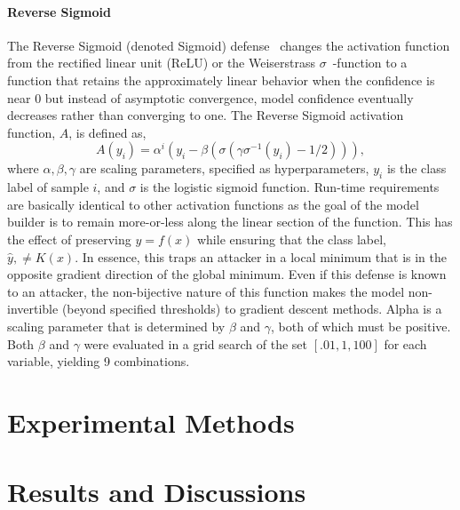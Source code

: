 \documentclass[lettersize,journal]{IEEEtran}
\newcommand{\erik}[1]{\textit{[{\color{brown}Erik: #1}]}}
\begin{document}
\paragraph{Reverse Sigmoid}
The Reverse Sigmoid (denoted Sigmoid) defense~\cite{reverse_sigmoid} changes the activation function from the rectified linear unit (ReLU) or the Weiserstrass $\sigma \!\!$~-function to a function that retains the approximately linear behavior when the confidence is near 0 but instead of asymptotic convergence, model confidence eventually decreases rather than converging to one. The Reverse Sigmoid activation function, $A$, is defined as,
$$
    A(y_i) = \alpha ^i (y_i - \beta(\sigma(\gamma \sigma^{-1}(y_i) - 1/2))),
$$
where $\alpha, \beta, \gamma$ are scaling parameters, specified as hyperparameters, $y_i$ is the class label of sample $i$, and $\sigma$ is the logistic sigmoid function. Run-time requirements are basically identical to other activation functions as the goal of the model builder is to remain more-or-less along the linear section of the function. This has the effect of preserving $y = f(x)$ while ensuring that the class label, $\hat{y},  \neq K(x)$. In essence, this traps an attacker in a local minimum that is in the opposite gradient direction of the global minimum. Even if this defense is known to an attacker, the non-bijective nature of this function makes the model non-invertible (beyond specified thresholds) to gradient descent methods. Alpha is a scaling parameter that is determined by $\beta$ and $\gamma$, both of which must be positive.
Both $\beta$ and $\gamma$ were evaluated in a grid search of the set $[.01, 1, 100]$ for each variable, yielding 9 combinations.


\section{Experimental Methods}
\label{methods}

\section{Results and Discussions}
\label{results}
\end{document}
